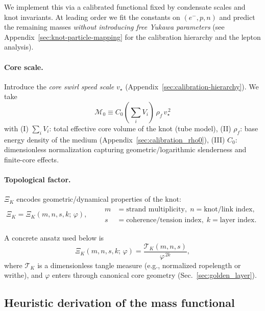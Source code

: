 \documentclass[smallextended]{svjour3}       %
\newcommand{\rhoF}{\rho_{\!f}}      %
\newcommand{\vstar}{v_\star}                           %
\begin{document}
	We implement this via a calibrated functional fixed by condensate scales and knot invariants. At leading order we fit the constants on \((e^{-},p,n)\) and predict the remaining masses \emph{without introducing free Yukawa parameters} (see Appendix~\ref{sec:knot-particle-mapping} for the calibration hierarchy and the lepton analysis).

	\paragraph{Core scale.}
	Introduce the \emph{core swirl speed scale} \(\vstar\) (Appendix~\ref{sec:calibration-hierarchy}). We take
	\begin{equation}
		\boxed{ \; \mathcal{M}_0 \equiv C_0 \left(\sum_i V_i\right)\,\rhoF\,\vstar^{\,2} \; }
		\label{eq:M0}
	\end{equation}
	with
	(I) \( \sum_i V_i \): total effective core volume of the knot (tube model),
	(II) \( \rhoF \): base energy density of the medium (Appendix~\ref{sec:calibration_rho0}),
	(III) \(C_0\): dimensionless normalization capturing geometric/logarithmic slenderness and finite-core effects.

	\paragraph{Topological factor.}
	\(\Xi_K\) encodes geometric/dynamical properties of the knot:
    \[
        \Xi_K = \Xi_K(m,n,s,k;\,\varphi),\qquad
        \begin{aligned}
        m&=\text{strand multiplicity},\; n=\text{knot/link index},\\
        s&=\text{coherence/tension index},\; k=\text{layer index}.
        \end{aligned}
    \]

	A concrete ansatz used below is
	\begin{equation}
		\Xi_K(m,n,s,k;\,\varphi) = \frac{\mathcal{T}_K(m,n,s)}{\varphi^{\,2k}},
		\label{eq:Xi-ansatz}
	\end{equation}
	where \(\mathcal{T}_K\) is a dimensionless tangle measure (e.g., normalized ropelength or writhe), and \(\varphi\) enters through canonical core geometry (Sec.~\ref{sec:golden_layer}).

	\subsection{Heuristic derivation of the mass functional}
\end{document}
